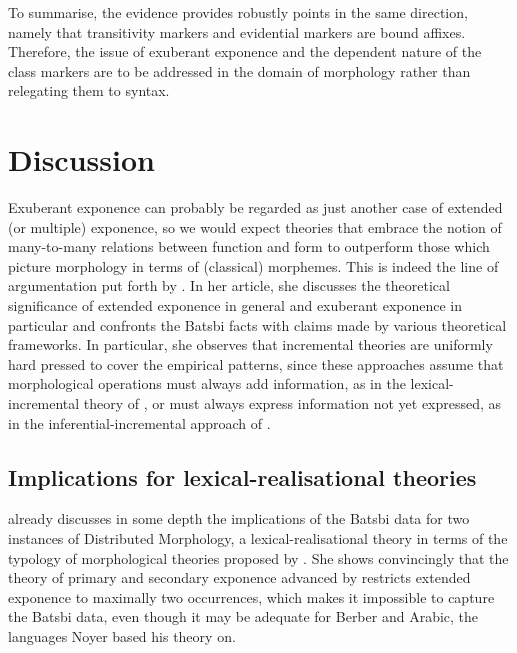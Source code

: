 \documentclass[output=paper]{langsci/langscibook}
\begin{document}
\bigskip\noindent
To summarise, the evidence \citet{Harris09} provides robustly points
in the same direction, namely that transitivity markers and
evidential markers are bound affixes. Therefore, the issue of
exuberant exponence and the dependent nature of the class markers are
to be addressed in the domain of morphology rather than relegating
them to syntax.

\section{Discussion}
\label{sec:Discussion}

Exuberant exponence can probably be regarded as just another case of
extended (or multiple) exponence, so we would expect theories that
embrace the notion of many-to-many relations between function and form
to outperform those which picture  morphology
in terms of (classical) morphemes. This is indeed the
line of argumentation put forth by \citet{Harris09}. In her article,
she discusses the theoretical significance of extended exponence in
general and exuberant exponence in particular and confronts the Batsbi
facts with claims made by various theoretical frameworks. In
particular, she observes that incremental theories are uniformly hard
pressed to cover the empirical patterns, since these approaches assume
that morphological operations must always add information, as in the
lexical-incremental theory of \citet{Wunderlich95}, or must always
express information not yet expressed, as in the
inferential-incremental approach of \citet{Steele95}.




\subsection{Implications for lexical-realisational theories}

\citet{Harris09} already discusses in some depth the implications of
the Batsbi data for two instances of Distributed Morphology, a
lexical-realisational theory in terms of the typology of morphological
theories proposed by \citet{Stump01}.  She shows convincingly that
the theory of primary and secondary exponence advanced by
\citet{Noyer92} restricts extended exponence to maximally two
occurrences, which makes it impossible to capture the Batsbi data,
even though it may be adequate for Berber and Arabic, the languages
Noyer based his theory on.
\end{document}
